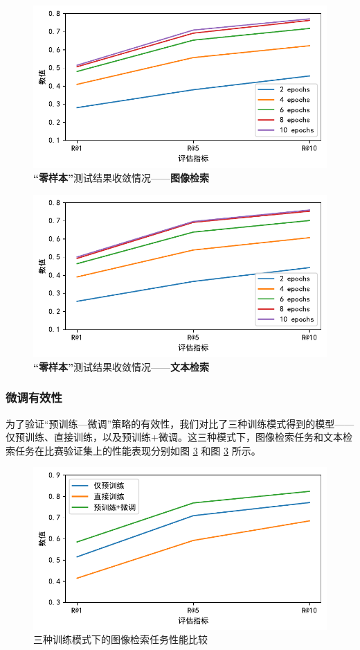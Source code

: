 \documentclass[a4paper]{zreport}
\begin{document}
\begin{figure}[t!]
\centering
\includegraphics[width=0.85\linewidth]{figures/pretrain_metric1}
\caption{\textbf{“零样本”}测试结果收敛情况——\textbf{图像检索}}
\label{fig:pretrainmetric1}
\end{figure}


\begin{figure}[t!]
\centering
\includegraphics[width=0.85\linewidth]{figures/pretrain_metric2}
\caption{\textbf{“零样本”}测试结果收敛情况——\textbf{文本检索}}
\label{fig:pretrainmetric2}
\end{figure}


\subsubsection{微调有效性}

为了验证“预训练—微调”策略的有效性，我们对比了三种训练模式得到的模型——仅预训练、直接训练，以及预训练+微调。这三种模式下，图像检索任务和文本检索任务在比赛验证集上的性能表现分别如图 \ref{fig:vs1} 和图 \ref{fig:vs1} 所示。

\begin{figure}[h!]
\centering
\includegraphics[width=0.85\linewidth]{figures/vs1}
\caption{三种训练模式下的图像检索任务性能比较}
\label{fig:vs1}
\end{figure}
\end{document}
